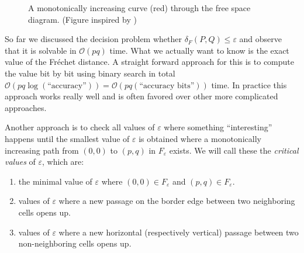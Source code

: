 \documentclass[
oneside,
fontsize=11pt
]{scrartcl}
\begin{document}
\begin{figure}[ht]
  \centering
  \caption{A monotonically increasing curve (red) through the free space diagram. 
    (Figure inspired by \cite{buchin_four_2017})}
  \label{fig_free_space_curve}
\end{figure}

So far we discussed the decision problem whether $\delta_{F}(P,Q) \leq \varepsilon$
and observe that it is solvable in $\mathcal{O}(pq)$ time.
What we actually want to know is the exact value of the Fréchet distance.
A straight forward approach for this is to compute the value bit by bit 
using binary search in total $\mathcal{O}(pq \log (\text{``accuracy''})) = \mathcal{O}(pq  (\text{``accuracy bits''}))$ time.
In practice this approach works really well 
and is often favored over other more complicated approaches. \cite{alt_computing_1995} 

Another approach is to check all values of $\varepsilon$ where something ``interesting'' happens
until the smallest value of $\varepsilon$ is obtained where a monotonically increasing path 
from $(0,0)$ to $(p,q)$ in $F_\varepsilon$ exists.
We will call these the \textit{critical values} of $\varepsilon$, which are:
\begin{enumerate}
  \item the minimal value of $\varepsilon$ where $(0,0) \in F_\varepsilon$ and $(p,q) \in F_\varepsilon$.
  \item values of $\varepsilon$ where a new passage on the border edge 
        between two neighboring cells opens up.
  \item values of $\varepsilon$ where a new horizontal (respectively vertical) passage 
        between two non-neighboring cells opens up.
\end{enumerate}
\end{document}

